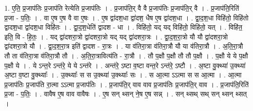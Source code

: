 \documentclass[17pt]{extarticle}
\begin{document}
1. ए॒ति॒ प्र॒जाप॑तिः प्र॒जाप॑ति रेत्येति प्र॒जाप॑तिः । . प्र॒जाप॑ति॒र् वै वै प्र॒जाप॑तिः प्र॒जाप॑ति॒र् वै । . प्र॒जाप॑ति॒रिति॑ प्र॒जा - प॒तिः॒ । . वा ए॒ष ए॒ष वै वा ए॒षः । . ए॒ष द्वा॑दश॒धा द्वा॑दश॒ धैष ए॒ष द्वा॑दश॒धा । . द्वा॒द॒श॒धा विहि॑तो॒ विहि॑तो द्वादश॒धा द्वा॑दश॒धा विहि॑तः । . द्वा॒द॒श॒धेति॑ द्वादश - धा । . विहि॑तो॒ यद् यद् विहि॑तो॒ विहि॑तो॒ यत् । . विहि॑त॒ इति॒ वि - हि॒तः॒ । . यद् द्वा॑दशरा॒त्रो द्वा॑दशरा॒त्रो यद् यद् द्वा॑दशरा॒त्रः । . द्वा॒द॒श॒रा॒त्रो यौ यौ द्वा॑दशरा॒त्रो द्वा॑दशरा॒त्रो यौ । . द्वा॒द॒श॒रा॒त्र इति॑ द्वादश - रा॒त्रः । . या व॑तिरा॒त्रा व॑तिरा॒त्रौ यौ या व॑तिरा॒त्रौ । . अ॒ति॒रा॒त्रौ तौ ता व॑तिरा॒त्रा व॑तिरा॒त्रौ तौ । . अ॒ति॒रा॒त्रावित्य॑ति - रा॒त्रौ । . तौ प॒क्षौ प॒क्षौ तौ तौ प॒क्षौ । . प॒क्षौ ये ये प॒क्षौ प॒क्षौ ये । . ये ऽन्त॒रे ऽन्त॑रे॒ ये ये ऽन्त॑रे । . अन्त॑रे॒ ऽष्टा व॒ष्टा वन्त॒रे ऽन्त॑रे॒ ऽष्टौ । . अ॒ष्टा वु॒क्थ्या॑ उ॒क्थ्या॑ अ॒ष्टा व॒ष्टा वु॒क्थ्याः᳚ । . उ॒क्थ्याः᳚ स स उ॒क्थ्या॑ उ॒क्थ्याः᳚ सः । . स आ॒त्मा ऽऽत्मा स स आ॒त्मा । . आ॒त्मा प्र॒जाप॑तिः प्र॒जाप॑ति रा॒त्मा ऽऽत्मा प्र॒जाप॑तिः । . प्र॒जाप॑ति॒र् वाव वाव प्र॒जाप॑तिः प्र॒जाप॑ति॒र् वाव । . प्र॒जाप॑ति॒रिति॑ प्र॒जा - प॒तिः॒ । . वावैष ए॒ष वाव वावैषः । . ए॒ष सन् थ्सन् ने॒ष ए॒ष सन्न् । . सन् थ्सथ् सथ् सन् थ्सन् थ्सत् । \newline
\end{document}
